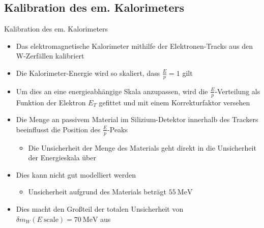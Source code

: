 \documentclass[aspectratio=1610, 9pt]{beamer}
\begin{document}
\subsection{Kalibration des em. Kalorimeters}

\begin{frame}{Kalibration des em. Kalorimeters}
  \begin{itemize}
    \item Das elektromagnetische Kalorimeter mithilfe der Elektronen-Tracks aus den W-Zerfällen kalibriert
    \item Die Kalorimeter-Energie wird so skaliert, dass $\frac{E}{p} = \num{1}$ gilt
    \item Um dies an eine energieabhängige Skala anzupassen, wird die $\frac{E}{p}$-Verteilung als Funktion der Elektron $E_T$ gefittet und mit einem Korrekturfaktor versehen
  \end{itemize}


\end{frame}

\begin{frame}
  \begin{itemize}
    \item Die Menge an passivem Material im Silizium-Detektor innerhalb des Trackers beeinflusst die Position des $\frac{E}{p}$-Peaks
    \begin{itemize}
      \item[\rightarrow] Die Unsicherheit der Menge des Materials geht direkt in die Unsicherheit der Energieskala über
    \end{itemize}
    \item Dies kann nicht gut modelliert werden
    \begin{itemize}
      \item[\rightarrow] Unsicherheit aufgrund des Materials beträgt $\SI{55}{\MeV}$
    \end{itemize}
    \item Dies macht den Großteil der totalen Unsicherheit von $\delta m_W (E \: \text{scale}) = \SI{70}{\MeV}$ aus
  \end{itemize}
\end{frame}
\end{document}
